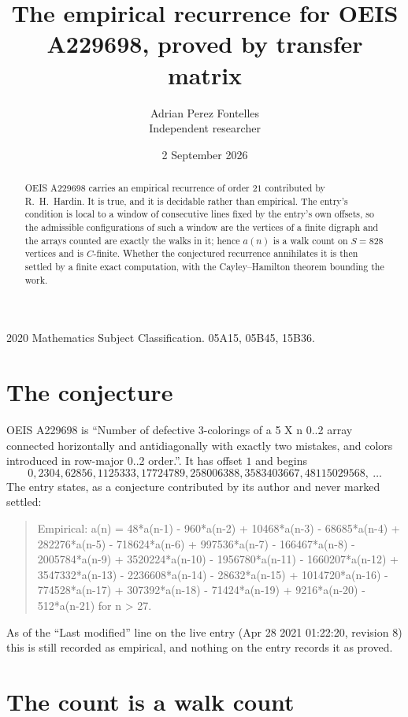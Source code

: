 \documentclass[11pt,a4paper]{article}
\title{The empirical recurrence for OEIS A229698, proved by transfer matrix}
\author{Adrian Perez Fontelles\\ \small Independent researcher}
\date{2 September 2026}
\theoremstyle{plain}
\theoremstyle{definition}
\begin{document}
\maketitle

\begin{abstract}
OEIS A229698 carries an empirical recurrence of order $21$ contributed by R.~H.~Hardin. It is
true, and it is decidable rather than empirical. The entry's condition is local to a window of consecutive lines fixed by the entry's own offsets, so
the admissible configurations of such a window are the vertices of a finite digraph and the
arrays counted are exactly the walks in it; hence $a(n)$ is a walk count on $S=828$ vertices
and is $C$-finite. Whether the conjectured recurrence annihilates it is then settled by a
finite exact computation, with the Cayley--Hamilton theorem bounding the work.
\end{abstract}

\noindent\small 2020 Mathematics Subject Classification. 05A15, 05B45, 15B36.\normalsize

\section{The conjecture}

OEIS A229698 is ``Number of defective 3-colorings of a 5 X n 0..2 array connected horizontally and antidiagonally with exactly two mistakes, and colors introduced in row-major 0..2 order.''. It has offset $1$ and begins
\[
0, 2304, 62856, 1125333, 17724789, 258006388, 3583403667, 48115029568,\ \dots
\]
The entry states, as a conjecture contributed by its author and never marked settled:
\begin{quote}
Empirical: a(n) = 48*a(n-1) - 960*a(n-2) + 10468*a(n-3) - 68685*a(n-4) + 282276*a(n-5) - 718624*a(n-6) + 997536*a(n-7) - 166467*a(n-8) - 2005784*a(n-9) + 3520224*a(n-10) - 1956780*a(n-11) - 1660207*a(n-12) + 3547332*a(n-13) - 2236608*a(n-14) - 28632*a(n-15) + 1014720*a(n-16) - 774528*a(n-17) + 307392*a(n-18) - 71424*a(n-19) + 9216*a(n-20) - 512*a(n-21) for n > 27.
\end{quote}
As of the ``Last modified'' line on the live entry (Apr 28 2021 01:22:20, revision 8) this is still
recorded as empirical, and nothing on the entry records it as proved.

\section{The count is a walk count}
\end{document}
